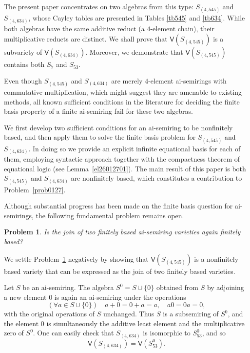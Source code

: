 \documentclass[reqno]{amsart}
\theoremstyle{plain}
\newtheorem{problem}[thm]{Problem}
\theoremstyle{definition}
\begin{document}
The present paper concentrates on two algebras from this type: $S_{(4, 545)}$ and $S_{(4, 634)}$,
whose Cayley tables are presented in Tables \ref{tb545} and \ref{tb634}.
While both algebras have the same additive reduct (a $4$-element chain), their multiplicative reducts are distinct.
We shall prove that $\mathsf{V}(S_{(4, 545)})$ is a subvariety of $\mathsf{V}(S_{(4, 634)})$.
Moreover, we demonstrate that $\mathsf{V}(S_{(4, 545)})$ contains both $S_7$ and $S_{53}$.

Even though $S_{(4,545)}$ and $S_{(4,634)}$ are merely $4$-element ai-semirings with commutative multiplication,
which might suggest they are amenable to existing methods,
all known sufficient conditions in the literature for deciding the finite basis property of a finite ai-semiring fail for these two algebras.

We first develop two sufficient conditions for an ai-semiring to be nonfinitely based,
and then apply them to solve the finite basis problem for $S_{(4,545)}$ and $S_{(4,634)}$.
In doing so we provide an explicit infinite equational basis for each of them,
employing syntactic approach together with the compactness theorem of equational logic (see Lemma~\ref{el26012701}).
The main result of this paper is both $S_{(4, 545)}$ and $S_{(4, 634)}$ are nonfinitely based,
which constitutes a contribution to Problem~\ref{prob0127}.

Although substantial progress has been made on the finite basis question for ai-semirings,
the following fundamental problem remains open.
\begin{problem}\label{problem1}
Is the join of two finitely based ai-semiring varieties again finitely based?
\end{problem}

We settle Problem~\ref{problem1} negatively by showing that $\mathsf{V}(S_{(4, 545)})$
is a nonfinitely based variety that can be expressed as
the join of two finitely based varieties.

Let $S$ be an ai-semiring.
The algebra $S^0 = S \cup \{0\}$ obtained from $S$ by adjoining a new element $0$ is again an ai-semiring under the operations
\[
(\forall a\in S\cup \{0\}) \quad a+0=0+a=a,\quad a0=0a=0,
\]
with the original operations of $S$ unchanged.
Thus $S$ is a subsemiring of $S^0$, and the element
$0$ is simultaneously the additive least element and the multiplicative zero of $S^0$.
One can easily check that $S_{(4, 634)}$ is isomorphic to $S^0_{53}$,
and so
\[
\mathsf{V}(S_{(4, 634)})=\mathsf{V}(S^0_{53}).
\]
\end{document}
